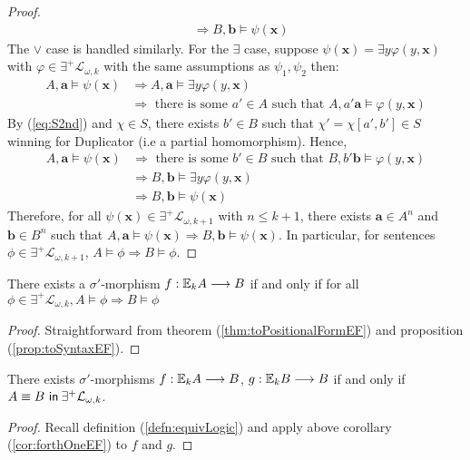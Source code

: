 \begin{prop}
\begin{proof}
\begin{align*}
&\Rightarrow B,\mathbf{b} \vDash \psi(\mathbf{x}) 
\end{align*}
The $\vee$ case is handled similarly. For the $\exists$ case, suppose $\psi(\mathbf{x}) = \exists y \varphi(y,\mathbf{x})$ with $\varphi \in \exists^{+}\mathcal{L}_{\omega,k}$ with the same assumptions as $\psi_{1},\psi_{2}$ then:  
\begin{align*}
A,\mathbf{a} \vDash \psi(\mathbf{x}) &\Rightarrow A,\mathbf{a} \vDash \exists y \varphi(y,\mathbf{x}) \\ 
&\Rightarrow \text{ there is some } a' \in A \text{ such that } A,a'\mathbf{a} \vDash \varphi(y,\mathbf{x}) 
\end{align*}
By (\ref{eq:S2nd}) and $\chi \in S$, there exists $b' \in B$ such that $\chi' = \chi[a',b'] \in S$ winning for Duplicator (i.e a partial homomorphism). Hence,
\begin{align*}
A,\mathbf{a} \vDash \psi(\mathbf{x}) &\Rightarrow \text{ there is some } b' \in B \text{ such that } B,b'\mathbf{b} \vDash \varphi(y,\mathbf{x}) \\  
&\Rightarrow B,\mathbf{b} \vDash \exists y \varphi(y,\mathbf{x}) \\  
&\Rightarrow B,\mathbf{b} \vDash \psi(\mathbf{x})   
\end{align*}
Therefore, for all $\psi(\mathbf{x}) \in \exists^{+}\mathcal{L}_{\omega,k+1}$ with $n \leq k+1$, there exists $\mathbf{a} \in A^{n}$ and $\mathbf{b} \in B^{n}$ such that $A,\mathbf{a} \vDash \psi(\mathbf{x}) \Rightarrow B,\mathbf{b} \vDash \psi(\mathbf{x})$. In particular, for sentences $\phi \in \exists^{+}\mathcal{L}_{\omega,k+1}$, $A \vDash \phi \Rightarrow B \vDash \phi$. 
\end{proof}
\begin{cor}
There exists a $\sigma'$-morphism $f:{\mathbb{E}_{k}A} \longrightarrow B$ if and only if for all $\phi \in \exists^{+}\mathcal{L}_{\omega,k}, A \vDash \phi \Rightarrow B \vDash \phi$
\begin{proof}
Straightforward from theorem (\ref{thm:toPositionalFormEF}) and proposition (\ref{prop:toSyntaxEF}).
\end{proof}
\label{cor:forthOneEF}
\end{cor}
\begin{cor}
There exists $\sigma'$-morphisms $f:{\mathbb{E}_{k}A} \longrightarrow B$, $g:{\mathbb{E}_{k}B} \longrightarrow B$ if and only if ${A \equiv B \ \mathsf{in}\: \exists^{+}\mathcal{L}_{\omega,k}}$. 
\begin{proof}
Recall definition (\ref{defn:equivLogic}) and apply above corollary (\ref{cor:forthOneEF}) to $f$ and $g$.  
\end{proof}
\label{cor:forthEF}
\end{cor}
\label{prop:toSyntaxEF}
\end{prop}
